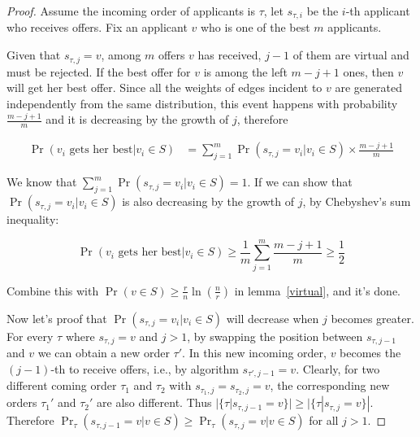 \begin{proof}
    Assume the incoming order of applicants is $\tau$, let
    $s_{\tau, i}$ be the $i$-th applicant who receives offers.
    Fix an applicant $v$ who is one of the best $m$ applicants.

        Given that $s_{\tau, j} = v$, among $m$ offers $v$ has
    received, $j - 1$ of them are virtual and must be rejected.
    If the best offer for $v$ is among the left $m - j + 1$ ones, then $v$
    will get her best offer. Since all the weights of edges incident to $v$ are generated
    independently from the same distribution, this event happens with
    probability $\frac{m - j + 1}{m}$ and it is decreasing by the growth
    of $j$, therefore

    \begin{align*}
        \Pr(v_i\text{ gets her best} | v_i \in S) &= \sum_{j = 1}^{m}
        \Pr(s_{\tau, j} = v_i | v_i \in S) \times \frac{m - j + 1}{m}
    \end{align*}

    We know that $\sum_{j = 1}^{m} \Pr(s_{\tau, j} = v_i | v_i \in S) = 1$.
    If we can show that $\Pr(s_{\tau, j} = v_i | v_i \in S)$ is also 
    decreasing by the growth of $j$, 
    by Chebyshev's sum inequality:

    $$\Pr(v_i\text{ gets her best} | v_i \in S) \ge \frac{1}{m} \sum_{j=1}^{m} \frac{m - j + 1}{m} \ge \frac{1}{2} $$

    Combine this with $\Pr(v \in S) \ge \frac{r}{n} \ln(\frac{n}{r})$ in lemma~\ref{virtual},
    and it's done.

    Now let's proof that $\Pr(s_{\tau, j} = v_i | v_i \in S)$ will decrease
    when $j$ becomes greater.
    For every $\tau$ where $s_{\tau, j} = v$ and $j > 1$, by swapping the
    position between $s_{\tau, j - 1}$ and $v$ we can obtain a new order $\tau'$.
    In this new incoming order, $v$ becomes the $(j-1)$-th to receive offers,
    i.e.,  by algorithm $s_{\tau', j - 1} = v$.
    Clearly, for two different coming order $\tau_1$ and $\tau_2$
    with $s_{\tau_1, j} = s_{\tau_2, j} = v$, the corresponding new orders
    $\tau_1'$ and $\tau_2'$ are also different.
    Thus $|\{\tau | s_{\tau, j-1} = v\}| \geq |\{\tau | s_{\tau, j} = v\}|$.
    Therefore
    $\Pr_{\tau}(s_{\tau, j - 1} = v | v \in S)
    \ge \Pr_{\tau}(s_{\tau, j} = v | v \in S)$ for all $j > 1$.
\end{proof}

